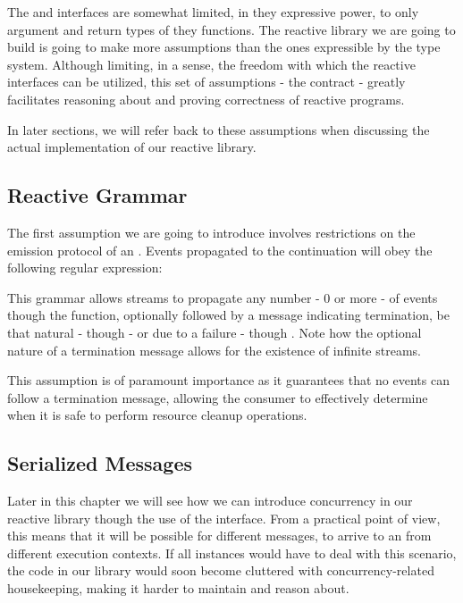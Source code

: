 The  and  interfaces are somewhat limited, in they expressive power, to only argument and return types of they functions. The reactive library we are going to build is going to make more assumptions than the ones expressible by the type system. Although limiting, in a sense, the freedom with which the reactive interfaces can be utilized, this set of assumptions - the contract - greatly facilitates reasoning about and proving correctness of reactive programs\cite{MS2010-RxDesign}.

In later sections, we will refer back to these assumptions when discussing the actual implementation of our reactive library.

\subsection{Reactive Grammar}
\label{ass-grammar}
The first assumption we are going to introduce involves restrictions on the emission protocol of an . Events propagated to the  continuation will obey the following regular expression:

\begin{center}\end{center}

This grammar allows streams to propagate any number - 0 or more - of events though the  function, optionally followed by a message indicating termination, be that natural - though  - or due to a failure - though . Note how the optional nature of a termination message allows for the existence of infinite streams. 

This assumption is of paramount importance as it guarantees that no events can follow a termination message, allowing the consumer to effectively determine when it is safe to perform resource cleanup operations. 

\subsection{Serialized Messages}
\label{ass-serialized}
Later in this chapter we will see how we can introduce concurrency in our reactive library though the use of the  interface. From a practical point of view, this means that it will be possible for different messages, to arrive to an  from different execution contexts. If all  instances would have to deal with this scenario, the code in our library would soon become cluttered with concurrency-related housekeeping, making it harder to maintain and reason about.

